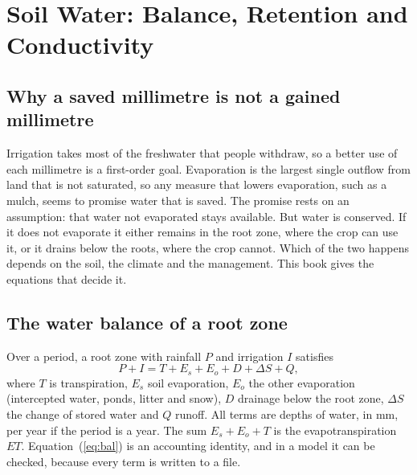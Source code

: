 \chapter{Soil Water: Balance, Retention and Conductivity}\label{chap:01}
\section{Why a saved millimetre is not a gained millimetre}
Irrigation takes most of the freshwater that people withdraw, so a better use of each millimetre is a first-order goal. Evaporation is the largest single outflow from land that is not saturated, so any measure that lowers evaporation, such as a mulch, seems to promise water that is saved. The promise rests on an assumption: that water not evaporated stays available. But water is conserved. If it does not evaporate it either remains in the root zone, where the crop can use it, or it drains below the roots, where the crop cannot. Which of the two happens depends on the soil, the climate and the management. This book gives the equations that decide it.


\section{The water balance of a root zone}
Over a period, a root zone with rainfall $P$ and irrigation $I$ satisfies
\begin{equation}\label{eq:bal}\boxed{P + I = T + E_s + E_o + D + \Delta S + Q ,}\end{equation}
where $T$ is transpiration, $E_s$ soil evaporation, $E_o$ the other evaporation (intercepted water, ponds, litter and snow), $D$ drainage below the root zone, $\Delta S$ the change of stored water and $Q$ runoff. All terms are depths of water, in mm, per year if the period is a year. The sum $E_s+E_o+T$ is the evapotranspiration $ET$. Equation~(\ref{eq:bal}) is an accounting identity, and in a model it can be checked, because every term is written to a file.

